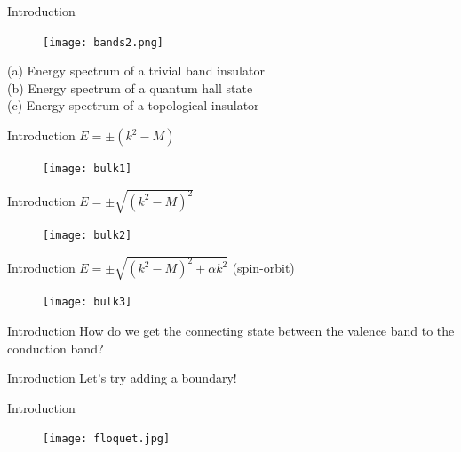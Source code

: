 \documentclass[]{beamer}
\begin{document}
\begin{frame}{Introduction}
\begin{figure}
\center
\texttt{[image: bands2.png]}

\end{figure}

(a) Energy spectrum of a trivial band insulator \\
(b)  Energy spectrum of a quantum hall state \\
(c)  Energy spectrum of a topological insulator \\

\end{frame}



\begin{frame}{Introduction}
$E = \pm(k^2 - M)$
\begin{figure}
\center
\texttt{[image: bulk1]}

\end{figure}
\end{frame}  


\begin{frame}{Introduction}
$E = \pm\sqrt{(k^2 - M)^2}$
\begin{figure}
\center
\texttt{[image: bulk2]}

\end{figure}
\end{frame}  


\begin{frame}{Introduction}
$E = \pm\sqrt{(k^2 - M)^2 +\alpha k^2}$ (spin-orbit)
\begin{figure}
\center
\texttt{[image: bulk3]}

\end{figure}
\end{frame}  

\begin{frame}{Introduction}
\center
How do we get the connecting state between the valence band to the conduction band?\\
\end{frame}  

\begin{frame}{Introduction}
\center
Let's try adding a boundary!
\end{frame}  

\begin{frame}{Introduction}
\begin{figure}
\center
\texttt{[image: floquet.jpg]}

\end{figure}
\end{frame} 
\end{document}
